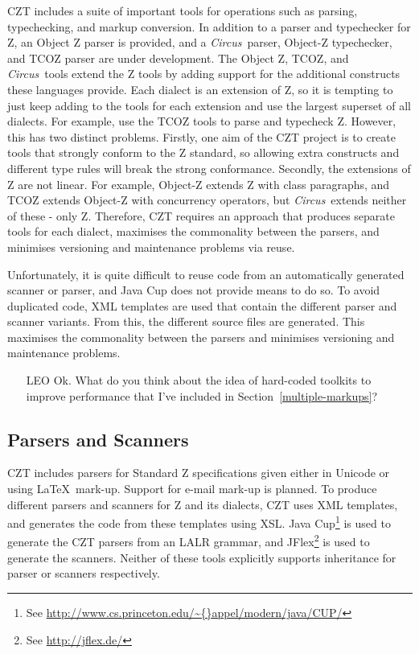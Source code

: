 \documentclass{llncs}
\newcommand{\Circus}{{\sf\slshape Circus}}
\begin{document}
  CZT includes a suite of important tools for operations such as parsing,
  typechecking, and markup conversion. In addition to a parser and
  typechecker for Z, an Object Z parser is provided, and a \Circus\
  parser, Object-Z typechecker, and TCOZ parser are under development.
  The Object Z, TCOZ, and \Circus\ tools extend the Z tools by adding
  support for the additional constructs these languages provide.  Each
  dialect is an extension of Z, so it is tempting to just keep adding
  to the tools for each extension and use the largest superset of all
  dialects. For example, use the TCOZ tools to parse and typecheck
  Z. However, this has two distinct problems. Firstly, one aim of the
  CZT project is to create tools that strongly conform to the Z
  standard, so allowing extra constructs and different type rules will
  break the strong conformance. Secondly, the extensions of Z are not
  linear. For example, Object-Z extends Z with class paragraphs, and
  TCOZ extends Object-Z with concurrency operators, but \Circus\ extends
  neither of these - only Z. Therefore, CZT requires an approach that
  produces separate tools for each dialect, maximises the commonality
  between the parsers, and minimises versioning and maintenance
  problems via reuse.

  Unfortunately, it is quite difficult to reuse code from an
  automatically generated scanner or parser, and Java Cup does not
  provide means to do so.  To avoid duplicated code, XML templates are
  used that contain the different parser and scanner variants.  From
  this, the different source files are generated.  This maximises the
  commonality between the parsers and minimises versioning and
  maintenance problems.

  \begin{itemize}
    \item[LEO] Ok. What do you think about the idea of hard-coded toolkits to
               improve performance that I've included in Section~\ref{multiple-markups}?
  \end{itemize}


\subsection{Parsers and Scanners}

  CZT includes parsers for Standard Z specifications given either in
  Unicode or using \LaTeX\ mark-up.  Support for e-mail mark-up is
  planned. To produce different parsers and scanners for Z and its
  dialects, CZT uses XML templates, and generates the code from these
  templates using XSL. Java Cup\footnote{See
  \url{http://www.cs.princeton.edu/\~{}appel/modern/java/CUP/}} is
  used to generate the CZT parsers from an LALR grammar, and
  JFlex\footnote{See \url{http://jflex.de/}} is used to generate the
  scanners. Neither of these tools explicitly supports inheritance for
  parser or scanners respectively.
\end{document}
